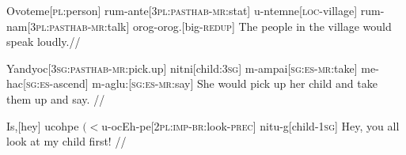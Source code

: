 \documentclass[12pt]{article}
\begin{document}
\exdisplay
\begingl
Ovoteme[\textsc{pl}:person]
rum-ante[\textsc{3pl:pasthab-mr:}stat]
u-ntemne[\textsc{loc}-village]
rum-nam[\textsc{3pl:pasthab-mr:}talk]
orog-orog.[big-\textsc{redup}]
\endilg
\glft The people in the village would speak loudly.//
\endgl
\xe

\exdisplay
\begingl
Yandyoc[\textsc{3sg:pasthab-mr:}pick.up]
nitni[child:\textsc{3sg}]
m-ampai[\textsc{sg:es-mr:}take]
me-hac[\textsc{sg:es-}ascend]
m-aglu:[\textsc{sg:es-mr:}say]
\endilg
\glft She would pick up her child and take them up and say. //
\endgl
\xe

\exdisplay
\begingl
Is,[hey]
{ucohpe $(<$u-ocEh-pe}[\textsc{2pl:imp-br:}look\textsc{-prec}]
nitu-g[child\textsc{-1sg}]
\endilg
\glft Hey, you all look at my child first! //
\endgl
\xe
\end{document}
